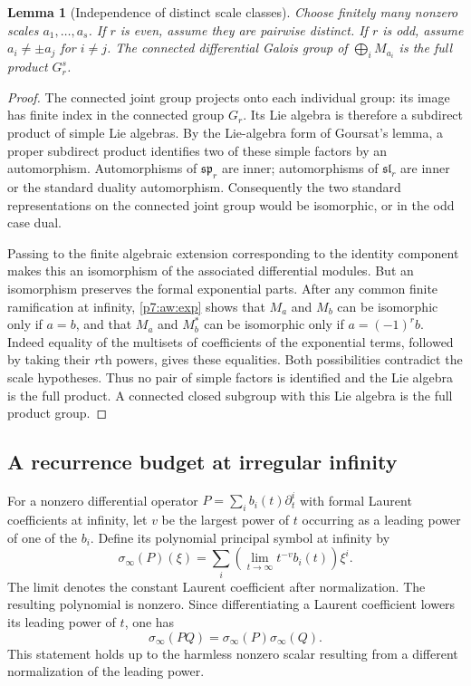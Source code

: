 \documentclass[11pt,a4paper]{article}
\newtheorem{lemma}[theorem]{Lemma}
\theoremstyle{definition}
\theoremstyle{remark}
\numberwithin{equation}{section}
\begin{document}
\begin{lemma}[Independence of distinct scale classes]
\label{p7:aw:independence}
Choose finitely many nonzero scales $a_1,\ldots,a_s$.
If $r$ is even, assume they are pairwise distinct. If $r$ is odd,
assume $a_i\ne\pm a_j$ for $i\ne j$. The connected differential
Galois group of $\bigoplus_i M_{a_i}$ is the full product
$G_r^s$.
\end{lemma}
\begin{proof}
The connected joint group projects onto each individual group:
its image has finite index in the connected group $G_r$.
Its Lie algebra is therefore a subdirect product of simple Lie
algebras. By the Lie-algebra form of Goursat's lemma, a proper
subdirect product identifies two of these simple factors by an
automorphism. Automorphisms of $\mathfrak{sp}_r$ are inner;
automorphisms of $\mathfrak{sl}_r$ are inner or the standard duality
automorphism. Consequently the two standard representations on the
connected joint group would be isomorphic, or in the odd case dual.

Passing to the finite algebraic extension corresponding to the
identity component makes this an isomorphism of the associated
differential modules. But an isomorphism preserves the formal
exponential parts. After any common finite ramification at infinity,
\eqref{p7:aw:exp} shows that $M_a$ and $M_b$ can be isomorphic only if
$a=b$, and that $M_a$ and $M_b^*$ can be isomorphic only if
$a=(-1)^r b$. Indeed equality of the multisets of coefficients of
the exponential terms, followed by taking their $r$th powers, gives
these equalities. Both possibilities contradict the scale hypotheses.
Thus no pair of simple factors is identified and the Lie algebra is
the full product. A connected closed subgroup with this Lie algebra
is the full product group.
\end{proof}

\subsection{A recurrence budget at irregular infinity}

For a nonzero differential operator
$P=\sum_i b_i(t)\partial_t^i$ with formal Laurent coefficients at
infinity, let $v$ be the largest power of $t$ occurring as a leading
power of one of the $b_i$. Define its polynomial principal symbol
at infinity by
\[
 \sigma_\infty(P)(\xi)=\sum_i
       \left(\lim_{t\to\infty}t^{-v}b_i(t)\right)\xi^i.
\]
The limit denotes the constant Laurent coefficient after normalization.
The resulting polynomial is nonzero. Since differentiating a Laurent
coefficient lowers its leading power of $t$, one has
\begin{equation}\label{p7:aw:symbol-product}
 \sigma_\infty(PQ)=\sigma_\infty(P)\sigma_\infty(Q).
\end{equation}
This statement holds up to the harmless nonzero scalar resulting
from a different normalization of the leading power.
\end{document}
